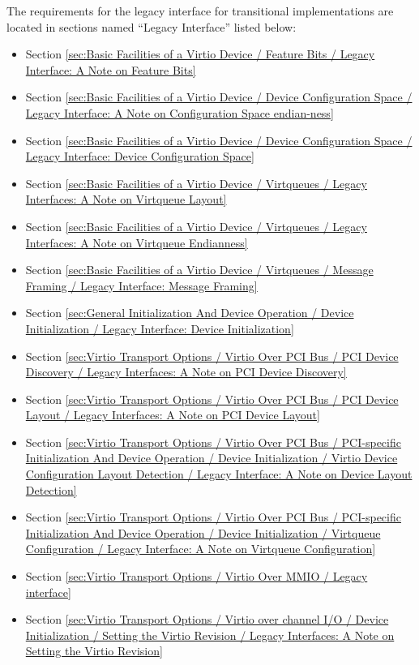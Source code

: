 The requirements for the legacy interface for transitional implementations
are located in sections named ``Legacy Interface'' listed below:
\begin{itemize}
\item Section \ref{sec:Basic Facilities of a Virtio Device /
Feature Bits / Legacy Interface: A Note on Feature Bits}
\item Section \ref{sec:Basic Facilities of a Virtio Device / Device Configuration Space / Legacy Interface: A Note on Configuration Space endian-ness}
\item Section \ref{sec:Basic Facilities of a Virtio Device / Device Configuration Space / Legacy Interface: Device Configuration Space}
\item Section \ref{sec:Basic Facilities of a Virtio Device / Virtqueues / Legacy Interfaces: A Note on Virtqueue Layout}
\item Section \ref{sec:Basic Facilities of a Virtio Device / Virtqueues / Legacy Interfaces: A Note on Virtqueue Endianness}
\item Section \ref{sec:Basic Facilities of a Virtio Device / Virtqueues / Message Framing / Legacy Interface: Message Framing}
\item Section \ref{sec:General Initialization And Device Operation / Device Initialization / Legacy Interface: Device Initialization}
\item Section \ref{sec:Virtio Transport Options / Virtio Over PCI Bus / PCI Device Discovery / Legacy Interfaces: A Note on PCI Device Discovery}
\item Section \ref{sec:Virtio Transport Options / Virtio Over PCI Bus / PCI Device Layout / Legacy Interfaces: A Note on PCI Device Layout}
\item Section \ref{sec:Virtio Transport Options / Virtio Over PCI Bus / PCI-specific Initialization And Device Operation / Device Initialization / Virtio Device Configuration Layout Detection / Legacy Interface: A Note on Device Layout Detection}
\item Section \ref{sec:Virtio Transport Options / Virtio Over PCI Bus / PCI-specific Initialization And Device Operation / Device Initialization / Virtqueue Configuration / Legacy Interface: A Note on Virtqueue Configuration}
\item Section \ref{sec:Virtio Transport Options / Virtio Over MMIO / Legacy interface}
\item Section \ref{sec:Virtio Transport Options / Virtio over channel I/O / Device Initialization / Setting the Virtio Revision / Legacy Interfaces: A Note on Setting the Virtio Revision}

\end{itemize}
